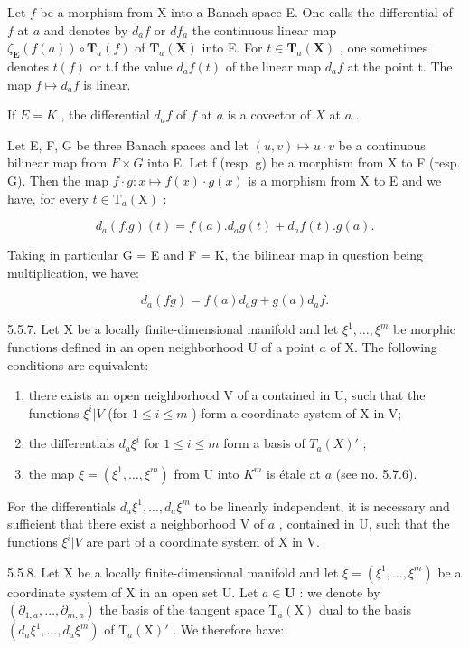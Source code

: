 Let \(f\) be a morphism from X into a Banach space E. One calls the differential of \(f\) at \(a\) and denotes by \(d_{a}f\) or \(df_{a}\) the continuous linear map \(\zeta_{\mathbf{E}}(f(a)) \circ \mathbf{T}_{a}(f)\) of \(\mathbf{T}_{a}(\mathbf{X})\) into E. For \(t \in \mathbf{T}_{a}(\mathbf{X})\) , one sometimes denotes \(t(f)\) or t.f the value \(d_{a}f(t)\) of the linear map \(d_{a}f\) at the point t. The map \(f \mapsto d_{a}f\) is linear.

If \(E = K\) , the differential \(d_a f\) of \(f\) at \(a\) is a covector of \(X\) at \(a\) .

Let E, F, G be three Banach spaces and let \((u, v) \mapsto u \cdot v\) be a continuous bilinear map from \(F \times G\) into E. Let f (resp. g) be a morphism from X to F (resp. G). Then the map \(f \cdot g : x \mapsto f(x) \cdot g(x)\) is a morphism from X to E and we have, for every \(t \in \mathrm{T}_{a}(\mathrm{X})\) :

\[
d _ {a} (f. g) (t) = f (a). d _ {a} g (t) + d _ {a} f (t). g (a).
\]

Taking in particular G = E and F = K, the bilinear map in question being multiplication, we have:

\[
d _ {a} (f g) = f (a) d _ {a} g + g (a) d _ {a} f.
\]

5.5.7. Let X be a locally finite-dimensional manifold and let \(\xi^{1},\ldots,\xi^{m}\) be morphic functions defined in an open neighborhood U of a point \(a\) of X. The following conditions are equivalent:

\begin{enumerate}
\def\labelenumi{(\roman{enumi})}
\item
  there exists an open neighborhood V of a contained in U, such that the functions \(\xi^{i}|V\) (for \(1 \leqslant i \leqslant m\) ) form a coordinate system of X in V;
\item
  the differentials \(d_a\xi^i\) for \(1 \leqslant i \leqslant m\) form a basis of \(T_a(X)'\) ;
\item
  the map \(\xi = (\xi^1, \ldots, \xi^m)\) from U into \(K^m\) is étale at \(a\) (see no. 5.7.6).
\end{enumerate}

For the differentials \(d_{a}\xi^{1},\ldots,d_{a}\xi^{m}\) to be linearly independent, it is necessary and sufficient that there exist a neighborhood V of \(a\) , contained in U, such that the functions \(\xi^{i}|V\) are part of a coordinate system of X in V.

5.5.8. Let X be a locally finite-dimensional manifold and let \(\xi = (\xi^1, \ldots, \xi^m)\) be a coordinate system of X in an open set U. Let \(a \in \mathbf{U}\) : we denote by \((\partial_{1,a}, \ldots, \partial_{m,a})\) the basis of the tangent space \(\mathrm{T}_a(\mathrm{X})\) dual to the basis \((d_a\xi^1, \ldots, d_a\xi^m)\) of \(\mathrm{T}_a(\mathrm{X})'\) . We therefore have:

